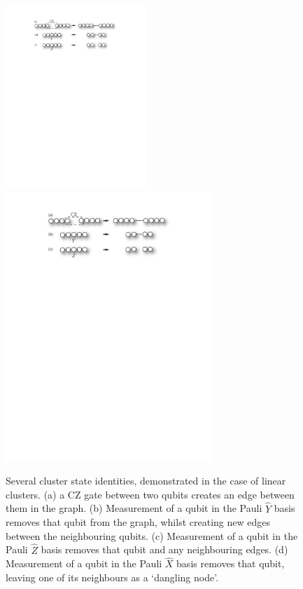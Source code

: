 \begin{figure}[!htbp]
\doublecol
	\includegraphics[clip=true, width=0.475\textwidth]{cluster_identities} 
\else
	\includegraphics[clip=true, width=0.7\textwidth]{cluster_identities} 
\fi
	\captionspacefig \caption{Several cluster state identities, demonstrated in the case of linear clusters. (a) a CZ gate between two qubits creates an edge between them in the graph. (b) Measurement of a qubit in the Pauli $\hat{Y}$ basis removes that qubit from the graph, whilst creating new edges between the neighbouring qubits. (c) Measurement of a qubit in the Pauli $\hat{Z}$ basis removes that qubit and any neighbouring edges. (d) Measurement of a qubit in the Pauli $\hat{X}$ basis removes that qubit, leaving one of its neighbours as a `dangling node'.} \label{fig:cluster_ident} 
\end{figure}

